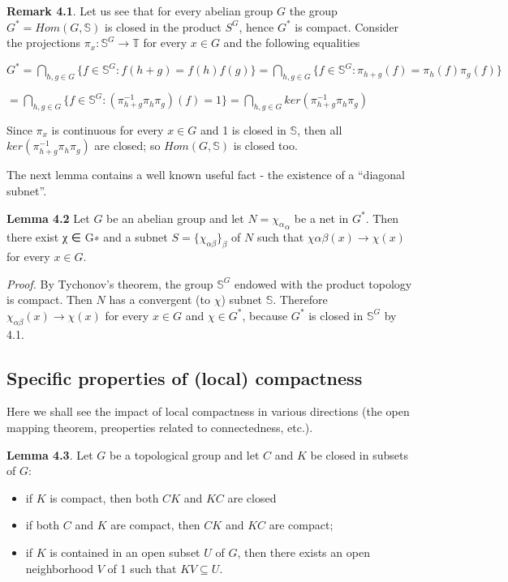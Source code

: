 \documentclass[12pt]{article}
\begin{document}
\textbf{Remark 4.1}. Let us see that for every abelian group $G$ the group $G^* = Hom (G, \mathbb{S})$ is closed in the product
$S^G$, hence $G^*$ is compact. Consider the projections $π_x : \mathbb{S}^G \to \mathbb{T}$ for every $x \in G$ and the following equalities


    $G^* = \bigcap_{h,g \in G} \{f \in \mathbb{S}^G : f(h + g) = f(h)f(g)\} = \bigcap_{h,g \in G} \{f \in \mathbb{S}^G : \pi_{h+g}(f) = \pi_h(f) \pi_g (f)\}$


        $= \bigcap_{h,g \in G} \{f \in \mathbb{S}^G : (\pi^{-1}_{h+g} \pi_h \pi_g)(f) = 1\} = \bigcap_{h,g \in G} ker(\pi^{-1}_{h+g} \pi_h \pi_g)$


Since $\pi_x$ is continuous for every $x \in G$ and {1} is closed in $\mathbb{S}$, then all $ker(\pi^{-1}_{h+g} \pi_h \pi_g)$ are closed; so $Hom (G, \mathbb{S})$
is closed too.


The next lemma contains a well known useful fact - the existence of a “diagonal subnet”.


\textbf{Lemma 4.2} Let $G$ be an abelian group and let $N = {\chi_\alpha}_\alpha$ be a net in $G^*$. Then there exist χ ∈ G∗ and a
subnet $S = \{\chi_{\alpha\beta}\}_\beta$ of $N$ such that $χαβ(x) → χ(x)$ for every $x \in G$.


\emph{Proof.} By Tychonov's theorem, the group $\mathbb{S}^G$ endowed with the product topology is compact. Then $N$ has a
convergent (to $\chi$) subnet $\mathbb{S}$. Therefore $\chi_{\alpha \beta}(x) → \chi(x)$ for every $x \in G$ and $χ \in G^*$, because $G^*$ is closed in $\mathbb{S}^G$
by 4.1.


\subsection{Specific properties of (local) compactness}


Here we shall see the impact of local compactness in various directions (the open mapping theorem, preoperties
related to connectedness, etc.).


\textbf{Lemma 4.3}. Let $G$ be a topological group and let $C$ and $K$ be closed in subsets of $G$:


\begin{itemize}

    \item if $K$ is compact, then both $CK$ and $KC$ are closed
    
    \item if both $C$ and $K$ are compact, then $CK$ and $KC$ are compact;

    \item if $K$ is contained in an open subset $U$ of $G$, then there exists an open neighborhood $V$ of 1 such that
    $KV \subseteq U$.
    
\end{itemize}
\end{document}
